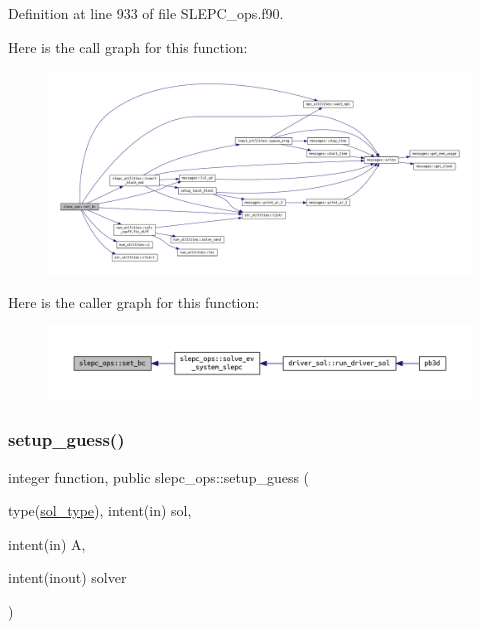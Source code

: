Definition at line 933 of file S\+L\+E\+P\+C\+\_\+ops.\+f90.

Here is the call graph for this function\+:\nopagebreak
\begin{figure}[H]
\begin{center}
\leavevmode
\includegraphics[width=350pt]{namespaceslepc__ops_a05f8a23335ed47ad1996cddf3bcfdc2e_cgraph}
\end{center}
\end{figure}
Here is the caller graph for this function\+:\nopagebreak
\begin{figure}[H]
\begin{center}
\leavevmode
\includegraphics[width=350pt]{namespaceslepc__ops_a05f8a23335ed47ad1996cddf3bcfdc2e_icgraph}
\end{center}
\end{figure}
\mbox{\label{namespaceslepc__ops_a17a57b58ac6ca48ff4bdb44e8689bb19}} 
\subsubsection{\texorpdfstring{setup\+\_\+guess()}{setup\_guess()}}
{\footnotesize\ttfamily integer function, public slepc\+\_\+ops\+::setup\+\_\+guess (\begin{DoxyParamCaption}\item[{type(\hyperlink{structsol__vars_1_1sol__type}{sol\+\_\+type}), intent(in)}]{sol,  }\item[{intent(in)}]{A,  }\item[{intent(inout)}]{solver }\end{DoxyParamCaption})}




